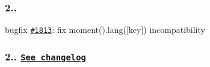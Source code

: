 \subsubsection*{2..}


\begin{DoxyItemize}
\item bugfix \href{https://github.com/moment/moment/issues/1813}{\tt \#1813}\+: fix moment().lang(\mbox{[}key\mbox{]}) incompatibility
\end{DoxyItemize}

\subsubsection*{2.. \href{https://gist.github.com/ichernev/ac3899324a5fa6c8c9b4}{\tt See changelog}}


